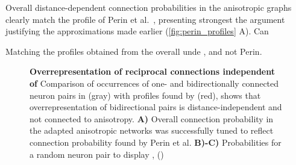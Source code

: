 


Overall distance-dependent connection probabilities in the anisotropic
graphs clearly match the profile of Perin et al.~, presenting strongest the
argument justifying the approximations made earlier
(\autoref{fig:perin_profiles} A).
 Can 

Matching the profiles obtained from the overall unde , and not Perin.






\begin{figure}[htp]
  \centering
  \vspace{-0.6cm}
  \vspace{-0.15cm}
  \caption{\textbf{Overrepresentation of reciprocal connections
      independent of } Comparison of occurrences of one- and
    bidirectionally connected neuron pairs in (gray) with profiles
    found by \textcite{Perin2011} (red), shows that overrepresentation of
    bidirectional pairs is distance-independent and not connected to
    anisotropy.  \textbf{A)} Overall connection probability in the
    adapted anisotropic networks was successfully tuned to reflect
    connection probability found by Perin et al. \textbf{B)-C)}
    Probabilities for a random neuron pair to display , 
    ()} %
  \label{fig:perin_profiles}
\end{figure}



